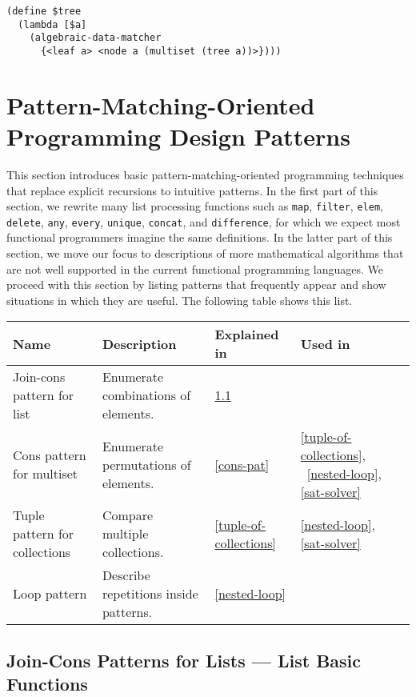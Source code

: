 \documentclass{article}
\begin{document}
{\footnotesize
\begin{lstlisting}[language=egison]
(define $tree
  (lambda [$a]
    (algebraic-data-matcher
      {<leaf a> <node a (multiset (tree a))>})))
\end{lstlisting}
}

\section{Pattern-Matching-Oriented Programming Design Patterns}\label{pmo1}

This section introduces basic pattern-matching-oriented programming techniques that replace explicit recursions to intuitive patterns.
In the first part of this section, we rewrite many list processing functions such as \texttt{map}, \texttt{filter}, \texttt{elem}, \texttt{delete}, \texttt{any}, \texttt{every}, \texttt{unique}, \texttt{concat}, and \texttt{difference}, for which we expect most functional programmers imagine the same definitions.
In the latter part of this section, we move our focus to descriptions of more mathematical algorithms that are not well supported in the current functional programming languages.
We proceed with this section by listing patterns that frequently appear and show situations in which they are useful.
The following table shows this list.

\begin{center}
  \footnotesize
  \begin{tabular}{llll}
    \toprule
    Name & Description & Explained in & Used in \\
    \midrule
    Join-cons pattern for list    & Enumerate combinations of elements.   & \ref{join-cons-pat} & \\
    Cons pattern for multiset     & Enumerate permutations of elements.   & \ref{cons-pat} & \ref{tuple-of-collections}, ~\ref{nested-loop}, \ref{sat-solver}\\
    Tuple pattern for collections & Compare multiple collections.         & \ref{tuple-of-collections} & \ref{nested-loop}, \ref{sat-solver} \\
    Loop pattern                  & Describe repetitions inside patterns. & \ref{nested-loop} & \\
    \bottomrule
  \end{tabular}
\end{center}


\subsection{Join-Cons Patterns for Lists --- List Basic Functions}\label{join-cons-pat}
\end{document}

